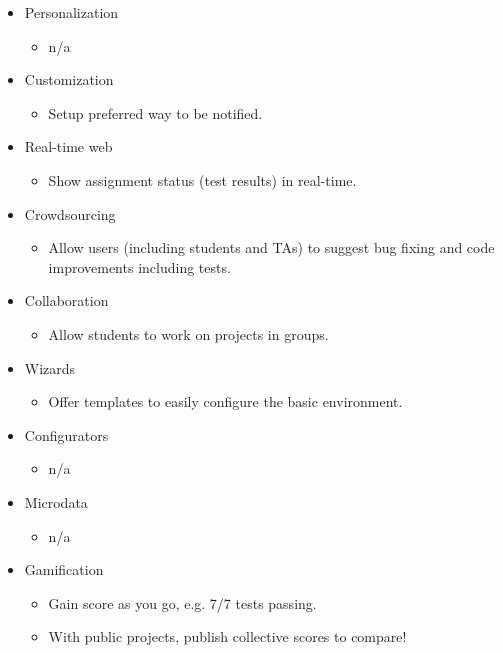 \begin{itemize}
  \item Personalization
  \begin{itemize}
    \item n/a
  \end{itemize}
  \item Customization
  \begin{itemize}
    \item Setup preferred way to be notified.
  \end{itemize}
  \item Real-time web
  \begin{itemize}
    \item Show assignment status (test results) in real-time.
  \end{itemize}
  \item Crowdsourcing
  \begin{itemize}
    \item Allow users (including students and TAs) to suggest bug fixing and code improvements including tests.
  \end{itemize}
  \item Collaboration
  \begin{itemize}
    \item Allow students to work on projects in groups.
  \end{itemize}
  \item Wizards
  \begin{itemize}
    \item Offer templates to easily configure the basic environment.
  \end{itemize}
  \item Configurators
  \begin{itemize}
    \item n/a
  \end{itemize}
  \item Microdata
  \begin{itemize}
    \item n/a
  \end{itemize}
  \item Gamification
  \begin{itemize}
    \item Gain score as you go, e.g. 7/7 tests passing.
    \item With public projects, publish collective scores to compare!
  \end{itemize}
\end{itemize}

